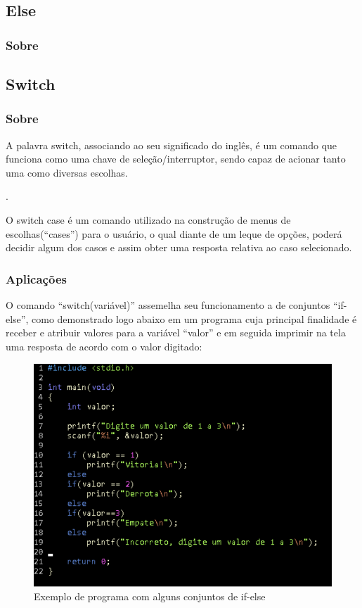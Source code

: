 \documentclass[a4paper,10pt]{article}  %
\begin{document}
 \subsection{Else}
 \subsubsection{Sobre} %

  
 \subsection{Switch}
 \subsubsection{Sobre} %
    
   A palavra switch, associando ao seu significado do inglês, é um comando que funciona como uma chave de seleção/interruptor, sendo capaz de acionar tanto uma como diversas escolhas.

  .

   O switch case é um comando utilizado na construção de menus de escolhas(“cases”) para o usuário, o qual diante de um leque de opções, poderá decidir algum dos casos e assim obter uma resposta relativa ao caso selecionado.
 

  \subsubsection{Aplicações}

   O comando “switch(variável)” assemelha seu funcionamento a de conjuntos “if-else”, como demonstrado logo abaixo em um programa cuja principal finalidade é receber e atribuir valores para a variável “valor” e em seguida imprimir na tela uma resposta de acordo com o valor digitado:

 \begin{figure}[H]
 \centering
 \includegraphics[width=.80\linewidth]{imagens/ex2.png}
 \caption{Exemplo de programa com alguns conjuntos de if-else}
 \label{fig:xsorta}
\end{figure}
\end{document}
